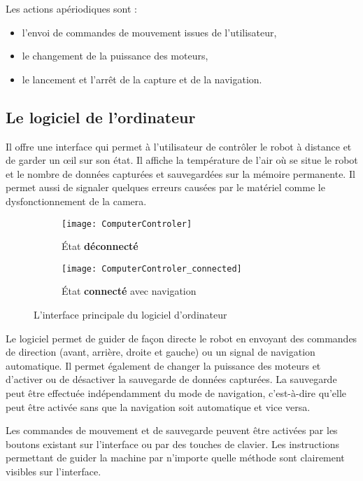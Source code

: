 \bigskip

Les actions apériodiques sont :
\begin{itemize}
  \item l'envoi de commandes de mouvement issues de l'utilisateur,
  \item le changement de la puissance des moteurs,
  \item le lancement et l'arrêt de la capture et de la navigation.
\end{itemize}

\subsection{Le logiciel de l'ordinateur}

Il offre une interface qui permet à l'utilisateur
de contrôler le robot à distance et de garder un œil sur son état. Il affiche la
température de l'air où se situe le robot et le nombre de données capturées et
sauvegardées sur la mémoire permanente. Il permet aussi de signaler quelques
erreurs causées par le matériel comme le dysfonctionnement de la camera.

\begin{figure}[h]
\begin{center}
  \begin{subfigure}{0.4\textwidth}
    \texttt{[image: ComputerControler]}
    \caption{\'Etat \textbf{déconnecté}}
  \end{subfigure}
  \hspace{2em}
  \begin{subfigure}{0.4\textwidth}
    \texttt{[image: ComputerControler\_connected]}
    \caption{\'Etat \textbf{connecté} avec navigation}
  \end{subfigure}
  \caption{L'interface principale du logiciel d'ordinateur}
\end{center}
\end{figure}

Le logiciel permet de guider de façon directe le robot en envoyant des commandes
de direction (avant, arrière, droite et gauche) ou un signal de
navigation automatique. Il permet également de changer la puissance des moteurs
et d'activer ou de désactiver la sauvegarde de données capturées.
La sauvegarde peut être effectuée indépendamment
du mode de navigation, c'est-à-dire qu'elle peut être activée sans que la
navigation soit automatique et vice versa.

Les commandes de mouvement et de sauvegarde peuvent être activées par les
boutons existant sur l'interface ou par des touches de clavier. Les instructions
permettant de guider la machine par n'importe quelle méthode sont clairement visibles
sur l'interface.

